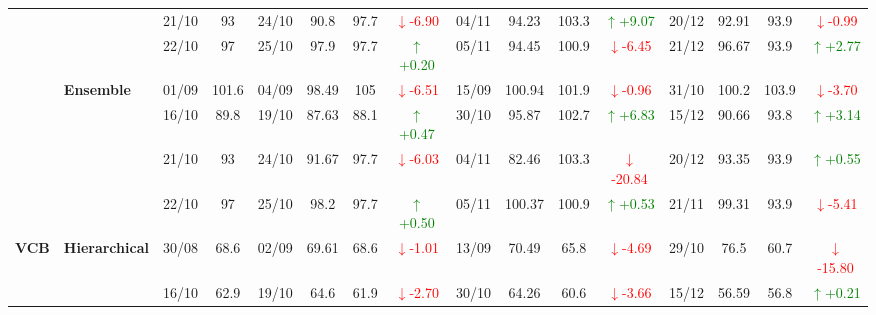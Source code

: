 {\begin{longtable}{llcc|cccc|cccc|cccc}
&
& 21/10 & 93 & 24/10 & 90.8 & 97.7 & \textcolor{red}{\(\downarrow\)-6.90} & 04/11 & 94.23 & 103.3 & \textcolor{green}{\(\uparrow\)+9.07} & 20/12 & 92.91 & 93.9 & \textcolor{red}{\(\downarrow\)-0.99} \\

&
& 22/10 & 97 & 25/10 & 97.9 & 97.7 & \textcolor{green}{\(\uparrow\)+0.20} & 05/11 & 94.45 & 100.9 & \textcolor{red}{\(\downarrow\)-6.45} & 21/12 & 96.67 & 93.9 & \textcolor{green}{\(\uparrow\)+2.77} \\
\cmidrule(lr){2-16}



& \textbf{Ensemble}
& 01/09 & 101.6 & 04/09 & 98.49 & 105 & \textcolor{red}{\(\downarrow\)-6.51} & 15/09 & 100.94 & 101.9 & \textcolor{red}{\(\downarrow\)-0.96} & 31/10 & 100.2 & 103.9 & \textcolor{red}{\(\downarrow\)-3.70} \\

&
& 16/10 & 89.8 & 19/10 & 87.63 & 88.1 & \textcolor{green}{\(\uparrow\)+0.47} & 30/10 & 95.87 & 102.7 & \textcolor{green}{\(\uparrow\)+6.83} & 15/12 & 90.66 & 93.8 & \textcolor{green}{\(\uparrow\)+3.14} \\

&
& 21/10 & 93 & 24/10 & 91.67 & 97.7 & \textcolor{red}{\(\downarrow\)-6.03} & 04/11 & 82.46 & 103.3 & \textcolor{red}{\(\downarrow\)-20.84} & 20/12 & 93.35 & 93.9 & \textcolor{green}{\(\uparrow\)+0.55} \\

&
& 22/10 & 97 & 25/10 & 98.2 & 97.7 & \textcolor{green}{\(\uparrow\)+0.50} & 05/11 & 100.37 & 100.9 & \textcolor{green}{\(\uparrow\)+0.53} & 21/11 & 99.31 & 93.9 & \textcolor{red}{\(\downarrow\)-5.41} \\
\midrule




\multirow{12}{*}{\textbf{VCB}} 
& \textbf{Hierarchical}
& 30/08 & 68.6 & 02/09 & 69.61 & 68.6 & \textcolor{red}{\(\downarrow\)-1.01} & 13/09 & 70.49 & 65.8 & \textcolor{red}{\(\downarrow\)-4.69} & 29/10 & 76.5 & 60.7 & \textcolor{red}{\(\downarrow\)-15.80} \\

&
& 16/10 & 62.9 & 19/10 & 64.6 & 61.9 & \textcolor{red}{\(\downarrow\)-2.70} & 30/10 & 64.26 & 60.6 & \textcolor{red}{\(\downarrow\)-3.66} & 15/12 & 56.59 & 56.8 & \textcolor{green}{\(\uparrow\)+0.21} \\


\end{longtable}}

